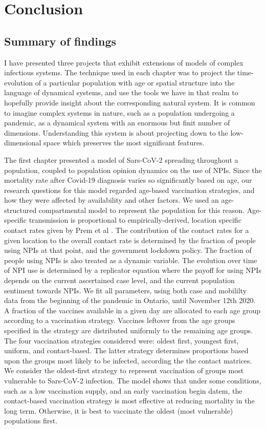 
\chapter{Conclusion}

\section{Summary of findings}

I have presented three projects that exhibit extensions of models of complex infectious systems. The technique used in each chapter was to project the time-evolution of a particular population with age or spatial structure into the language of dynamical systems, and use the tools we have in that realm to hopefully provide insight about the corresponding natural system. It is common to imagine complex systems in nature, such as a population undergoing a pandemic, as a dynamical system with an enormous but finit number of dimensions. Understanding this system is about projecting down to the low-dimensional space which preserves the most significant features. 

The first chapter presented a model of Sars-CoV-2 spreading throughout a population, coupled to population opinion dynamics on the use of NPIs. Since the mortality rate after Covid-19 diagnosis varies so significantly based on age, our research questions for this model regarded age-based vaccination strategies, and how they were affected by availability and other factors. We used an age-structured compartmental model to represent the population for this reason. Age-specific transmission is proportional to empirically-derived, location specific contact rates given by Prem et al \cite{prem2020projecting}. The contribution of the contact rates for a given location to the overall contact rate is determined by the fraction of people using NPIs at that point, and the government lockdown policy. The fraction of people using NPIs is also treated as a dynamic variable. The evolution over time of NPI use is determined by a replicator equation where the payoff for using NPIs depends on the current ascertained case level, and the current population sentiment towards NPIs. We fit all parameters, using both case and mobililty data from the beginning of the pandemic in Ontario, until November 12th 2020. A fraction of the vaccines available in a given day are allocated to each age group according to a vaccination strategy. Vaccines leftover from the age groups specified in the strategy are distributed uniformly to the remaining age groups. The four vaccination strategies considered were: oldest first, youngest first, uniform, and contact-based. The latter strategy determines proportions based upon the groups most likely to be infected, according the the contact matrices. We consider the oldest-first strategy to represent vaccination of groups most vulnerable to Sars-CoV-2 infection. The model shows that under some conditions, such as a low vaccination supply, and an early vaccination begin datem, the contact-based vaccination strategy is most effective at reducing mortality in the long term. Otherwise, it is best to vaccinate the oldest (most vulnerable) populations first.


